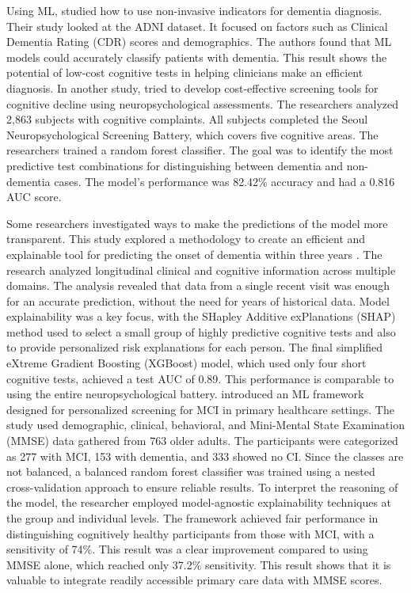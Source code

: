 Using ML,  studied how to use non-invasive indicators for dementia diagnosis. Their study looked at the ADNI dataset. It focused on factors such as Clinical Dementia Rating (\acrshort{CDR}) scores and demographics. The authors found that ML models could accurately classify patients with dementia. This result shows the potential of low-cost cognitive tests in helping clinicians make an efficient diagnosis. In another study,  tried to develop cost-effective screening tools for cognitive decline using neuropsychological assessments. The researchers analyzed 2,863 subjects with cognitive complaints. All subjects completed the Seoul Neuropsychological Screening Battery, which covers five cognitive areas. The researchers trained a random forest classifier. The goal was to identify the most predictive test combinations for distinguishing between dementia and non-dementia cases. The model's performance was 82.42\% accuracy and had a 0.816 AUC score.

Some researchers investigated ways to make the predictions of the model more transparent. This study explored a methodology to create an efficient and explainable tool for predicting the onset of dementia within three years \cite{Beebe-Wang2021Efficient}. The research analyzed longitudinal clinical and cognitive information across multiple domains. The analysis revealed that data from a single recent visit was enough for an accurate prediction, without the need for years of historical data. Model explainability was a key focus, with the SHapley Additive exPlanations (\acrshort{SHAP}) method used to select a small group of highly predictive cognitive tests and also to provide personalized risk explanations for each person. The final simplified eXtreme Gradient Boosting (\acrshort{XGBoost}) model, which used only four short cognitive tests, achieved a test AUC of 0.89. This performance is comparable to using the entire neuropsychological battery.  introduced an ML framework designed for personalized screening for MCI in primary healthcare settings. The study used demographic, clinical, behavioral, and Mini-Mental State Examination (\acrshort{MMSE}) data gathered from 763 older adults. The participants were categorized as 277 with MCI, 153 with dementia, and 333 showed no CI. Since the classes are not balanced, a balanced random forest classifier was trained using a nested cross-validation approach to ensure reliable results. To interpret the reasoning of the model, the researcher employed model-agnostic explainability techniques at the group and individual levels. The framework achieved fair performance in distinguishing cognitively healthy participants from those with MCI, with a sensitivity of 74\%. This result was a clear improvement compared to using MMSE alone, which reached only 37.2\% sensitivity. This result shows that it is valuable to integrate readily accessible primary care data with MMSE scores.

